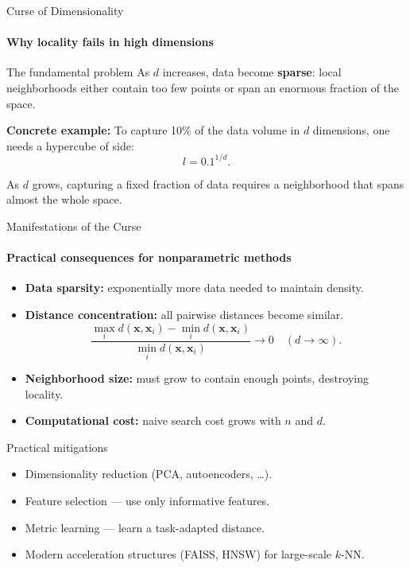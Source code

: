 \begin{frame}{Curse of Dimensionality}
  \framesubtitle{Why locality fails in high dimensions}
  \begin{alertblock}{The fundamental problem}
    As $d$ increases, data become \textbf{sparse}:
    local neighborhoods either contain too few points or span an enormous fraction of the space.
  \end{alertblock}
  \bigskip
  \textbf{Concrete example:} To capture 10\% of the data volume in $d$ dimensions, one needs a hypercube of side:
  \[
    l = 0.1^{1/d}.
  \]
  \begin{center}
  \end{center}
  {\small As $d$ grows, capturing a fixed fraction of data requires a neighborhood that spans almost the whole space.}
\end{frame}

\begin{frame}{Manifestations of the Curse}
  \framesubtitle{Practical consequences for nonparametric methods}
  \begin{itemize}
    \item \textbf{Data sparsity:} exponentially more data needed to maintain density.
    \item \textbf{Distance concentration:} all pairwise distances become similar.
      \[\frac{\max_i d(\mathbf{x},\mathbf{x}_i) - \min_i d(\mathbf{x},\mathbf{x}_i)}{\min_i d(\mathbf{x},\mathbf{x}_i)} \to 0 \quad (d\to\infty).\]
    \item \textbf{Neighborhood size:} must grow to contain enough points, destroying locality.
    \item \textbf{Computational cost:} naive search cost grows with $n$ and $d$.
  \end{itemize}
  \medskip
  \begin{block}{Practical mitigations}
    \begin{itemize}
      \item Dimensionality reduction (PCA, autoencoders, \ldots).
      \item Feature selection — use only informative features.
      \item Metric learning — learn a task-adapted distance.
      \item Modern acceleration structures (FAISS, HNSW) for large-scale $k$-NN.
    \end{itemize}
  \end{block}
\end{frame}

